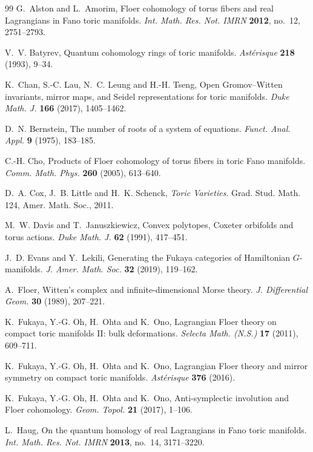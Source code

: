 \documentclass[11pt]{article}
\theoremstyle{definition}
\theoremstyle{remark}
\begin{document}
\begin{thebibliography}{99}
G.~Alston and L.~Amorim, Floer cohomology of torus fibers and real Lagrangians in Fano toric manifolds. \emph{Int. Math. Res. Not.
IMRN} \textbf{2012}, no.~12, 2751--2793.

V.~V. Batyrev, Quantum cohomology rings of toric manifolds. \emph{Astérisque} \textbf{218} (1993), 9--34.

K.~Chan, S.-C. Lau, N.~C. Leung and H.-H. Tseng, Open Gromov--Witten invariants, mirror maps, and Seidel representations for toric
manifolds. \emph{Duke Math. J.} \textbf{166} (2017), 1405--1462.

D.~N. Bernstein, The number of roots of a system of equations. \emph{Funct. Anal. Appl.} \textbf{9} (1975), 183--185.

C.-H. Cho, Products of Floer cohomology of torus fibers in toric Fano manifolds. \emph{Comm. Math. Phys.} \textbf{260} (2005),
613--640.

D.~A. Cox, J.~B. Little and H.~K. Schenck, \emph{Toric Varieties}. Grad. Stud. Math. 124, Amer. Math. Soc., 2011.

M.~W. Davis and T.~Januszkiewicz, Convex polytopes, Coxeter orbifolds and torus actions. \emph{Duke Math. J.} \textbf{62} (1991),
417--451.

J.~D. Evans and Y.~Lekili, Generating the Fukaya categories of Hamiltonian $G$-manifolds. \emph{J. Amer. Math. Soc.} \textbf{32}
(2019), 119--162.

A.~Floer, Witten's complex and infinite-dimensional Morse theory. \emph{J. Differential Geom.} \textbf{30} (1989), 207--221.

K.~Fukaya, Y.-G. Oh, H.~Ohta and K.~Ono, Lagrangian Floer theory on compact toric manifolds {II}: bulk deformations.
\emph{Selecta Math. (N.S.)} \textbf{17} (2011), 609--711.

K.~Fukaya, Y.-G. Oh, H.~Ohta and K.~Ono, Lagrangian Floer theory and mirror symmetry on compact toric manifolds. \emph{Astérisque}
\textbf{376} (2016).

K.~Fukaya, Y.-G. Oh, H.~Ohta and K.~Ono, Anti-symplectic involution and Floer cohomology. \emph{Geom. Topol.} \textbf{21} (2017),
1--106.

L.~Haug, On the quantum homology of real Lagrangians in Fano toric manifolds. \emph{Int. Math. Res. Not. IMRN} \textbf{2013}, no.~14,
3171--3220.


\end{thebibliography}
\end{document}
